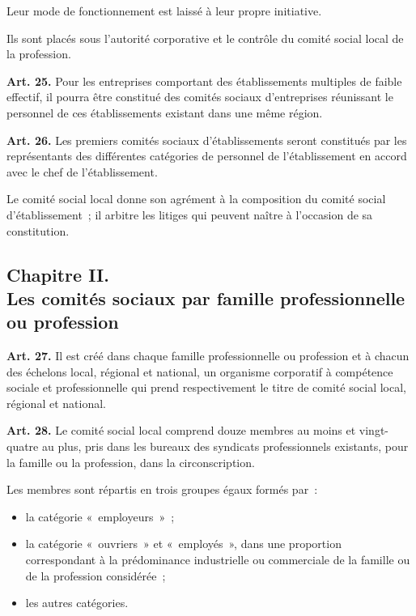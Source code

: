 \documentclass[french,twoside]{book} %
\newcommand{\labelchar}[1]{\textbf{\color{rubric} #1}}
\begin{document}
\noindent Leur mode de fonctionnement est laissé à leur propre initiative.\par
Ils sont placés sous l’autorité corporative et le contrôle du comité social local de la profession.\par
\bigbreak
\noindent \labelchar{Art. 25.} Pour les entreprises comportant des établissements multiples de faible effectif, il pourra être constitué des comités sociaux d’entreprises réunissant le personnel de ces établissements existant dans une même région.\par
\bigbreak
\noindent \labelchar{Art. 26.} Les premiers comités sociaux d’établissements seront constitués par les représentants des différentes catégories de personnel de l’établissement en accord avec le chef de l’établissement.\par
Le comité social local donne son agrément à la composition du comité social d’établissement ; il arbitre les litiges qui peuvent naître à l’occasion de sa constitution.
\subsection[{Chapitre II. Les comités sociaux par famille professionnelle ou profession}]{Chapitre II. \\
Les comités sociaux par famille professionnelle ou profession}
\noindent \labelchar{Art. 27.} Il est créé dans chaque famille professionnelle ou profession et à chacun des échelons local, régional et national, un organisme corporatif à compétence sociale et professionnelle qui prend respectivement le titre de comité social local, régional et national.\par
\bigbreak
\noindent \labelchar{Art. 28.} Le comité social local comprend douze membres au moins et vingt-quatre au plus, pris dans les bureaux des syndicats professionnels existants, pour la famille ou la profession, dans la circonscription.\par
Les membres sont répartis en trois groupes égaux formés par :\par

\begin{itemize}[itemsep=0pt,]
\item la catégorie « employeurs » ;
\item la catégorie « ouvriers » et « employés », dans une proportion correspondant à la prédominance industrielle ou commerciale de la famille ou de la profession considérée ;
\item les autres catégories.
\end{itemize}
\end{document}
